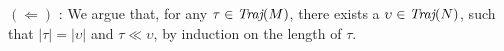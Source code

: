 $(\Leftarrow)$ : We argue that, for any $\tau \in \operatorname{\textit{Traj}}(M)$, there exists a $\upsilon \in \operatorname{\textit{Traj}}(N)$, such that $| \tau | = | \upsilon |$ and $\tau \ll \upsilon$, by induction on the length of $\tau$. \todo{\dots}





